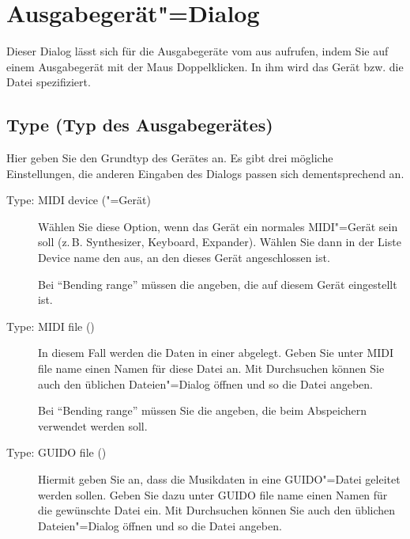 \section{Ausgabegerät"=Dialog}
\label{sec:DE_R4}

Dieser Dialog lässt sich für die Ausgabegeräte vom  
aus aufrufen, indem Sie auf einem Ausgabegerät mit der Maus 
Doppelklicken. In ihm wird das Gerät bzw. die Datei spezifiziert.

\subsection{Type (Typ des Ausgabegerätes)}

Hier geben Sie den Grundtyp des Gerätes an. Es gibt drei mögliche 
Einstellungen, die anderen Eingaben des Dialogs passen sich dementsprechend 
an.

\begin{description}
\item[Type: MIDI device ("=Gerät)] Wählen
  Sie diese Option, wenn das Gerät ein normales MIDI"=Gerät sein soll
  (z.\,B. Synthesizer, Keyboard, Expander). Wählen Sie dann in der Liste
  Device name den  aus, an den dieses
  Gerät angeschlossen ist.

  Bei "`Bending range"' müssen die  angeben, die auf diesem Gerät eingestellt ist.

\item[Type: MIDI file ()] In
  diesem Fall werden die Daten in einer
   abgelegt. Geben Sie unter
  MIDI file name einen Namen für diese Datei an. Mit Durchsuchen
  können Sie auch den üblichen Dateien"=Dialog öffnen und so die Datei
  angeben.

  Bei "`Bending range"' müssen Sie die
   angeben, die beim
  Abspeichern verwendet werden soll.

\item[Type: GUIDO file ()] Hiermit
  geben Sie an, dass die Musikdaten in eine GUIDO"=Datei geleitet
  werden sollen. Geben Sie dazu unter GUIDO file name einen Namen für
  die gewünschte Datei ein. Mit Durchsuchen können Sie auch den
  üblichen Dateien"=Dialog öffnen und so die Datei angeben.
\end{description}

